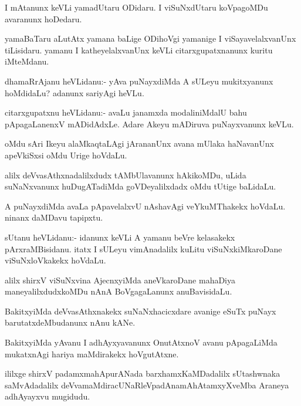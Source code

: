 \begin{mng}
I mAtanunx keVLi yamadUtaru ODidaru. I viSuNxdUtaru koVpagoMDu avaranunx hoDedaru.
\end{mng}

\begin{mng}
yamaBaTaru aLutAtx yamana baLige ODihoVgi yamanige I viSayavelalxvanUnx tiLisidaru. yamanu I katheyelalxvanUnx keVLi citarxgupatxnanunx kuritu iMteMdanu.
\end{mng}

\begin{mng}
dhamaRrAjanu heVLidanu:- yAva puNayxdiMda A sULeyu mukitxyanunx hoMdidaLu? adanunx sariyAgi heVLu.
\end{mng}

\begin{mng}
citarxgupatxnu heVLidanu:- avaLu janamxda modaliniMdalU bahu pApagaLanenxV mADidAdxLe. Adare Akeyu mADiruva puNayxvanunx keVLu.
\end{mng}

\begin{mng}
oMdu sAri Ikeyu alaMkaqtaLAgi jArananUnx avana mUlaka haNavanUnx apeVkiSxsi oMdu Urige hoVdaLu.
\end{mng}

\begin{mng}
alilx deVvasAthxnadalilxdudx tAMbUlavanunx hAkikoMDu, uLida suNaNxvanunx huDugATadiMda goVDeyalilxdadx oMdu tUtige baLidaLu.
\end{mng}

\begin{mng}
A puNayxdiMda avaLa pApavelalxvU nAshavAgi veYkuMThakekx hoVdaLu. ninanx daMDavu tapipxtu.
\end{mng}

\begin{mng}
sUtanu heVLidanu:- idanunx keVLi A yamanu beVre kelasakekx pArxraMBisidanu. itatx I sULeyu vimAnadalilx kuLitu viSuNxkiMkaroDane viSuNxloVkakekx hoVdaLu.
\end{mng}

\begin{mng}
alilx shirxV viSuNxvina AjecnxyiMda aneVkaroDane mahaDiya maneyalilxdudxkoMDu nAnA BoVgagaLanunx anuBavisidaLu.
\end{mng}

\begin{mng}
BakitxyiMda deVvasAthxnakekx suNaNxhacicxdare avanige eSuTx puNayx barutatxdeMbudanunx nAnu kANe.
\end{mng}

\begin{mng}
BakitxyiMda yAvanu I adhAyxyavanunx OnutAtxnoV avanu pApagaLiMda mukatxnAgi hariya maMdirakekx hoVgutAtxne.
\end{mng}
ililxge shirxV padamxmahApurANada barxhamxKaMDadalilx sUtashwnaka saMvAdadalilx deVvamaMdiracUNaRleVpadAnamAhAtamxyXveMba Araneya adhAyayxvu mugidudu.

